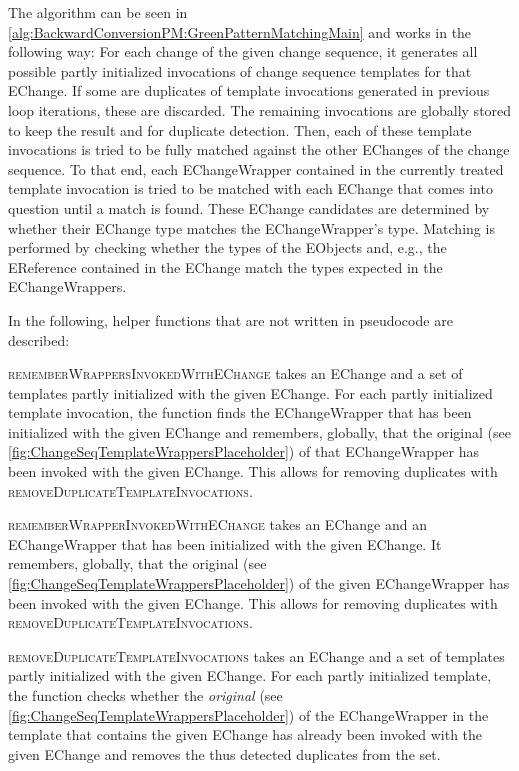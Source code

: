 The algorithm can be seen in \autoref{alg:BackwardConversionPM:GreenPatternMatchingMain} and works in the following way:
For each change of the given change sequence, it generates all possible partly initialized invocations of change sequence templates for that EChange. If some are duplicates of template invocations generated in previous loop iterations, these are discarded. The remaining invocations are globally stored to keep the result and for duplicate detection.
Then, each of these  template invocations is tried to be fully matched against the other EChanges of the change sequence.
To that end, each EChangeWrapper contained in the currently treated template invocation
is tried to be matched with each EChange that comes into question until a match is found.
These EChange candidates are determined by whether their EChange type matches the EChangeWrapper's type.
Matching is performed by checking whether the types of the EObjects and, e.g., the EReference contained in the EChange match the types expected in the EChangeWrappers. 

In the following, helper functions that are not written in pseudocode are described:

\textsc{rememberWrappersInvokedWithEChange} takes an EChange and a set of templates partly initialized with the given EChange.
For each partly initialized template invocation, the function finds the EChangeWrapper that has been initialized with the given EChange and remembers, globally, that the original (see \autoref{fig:ChangeSeqTemplateWrappersPlaceholder}) of that EChangeWrapper has been invoked with the given EChange. This allows for removing duplicates with \textsc{removeDuplicateTemplateInvocations}.

\textsc{rememberWrapperInvokedWithEChange} takes an EChange and an EChangeWrapper that has been initialized with the given EChange.
It remembers, globally, that the original (see \autoref{fig:ChangeSeqTemplateWrappersPlaceholder}) of the given EChangeWrapper has been invoked with the given EChange. This allows for removing duplicates with \textsc{removeDuplicateTemplateInvocations}.

\textsc{removeDuplicateTemplateInvocations} takes an EChange and a set of templates partly initialized with the given EChange.
For each partly initialized template, the function checks whether the \emph{original} (see \autoref{fig:ChangeSeqTemplateWrappersPlaceholder})  of the EChangeWrapper in the template that contains the given EChange has already been invoked with the given EChange and removes the thus detected duplicates from the set.

